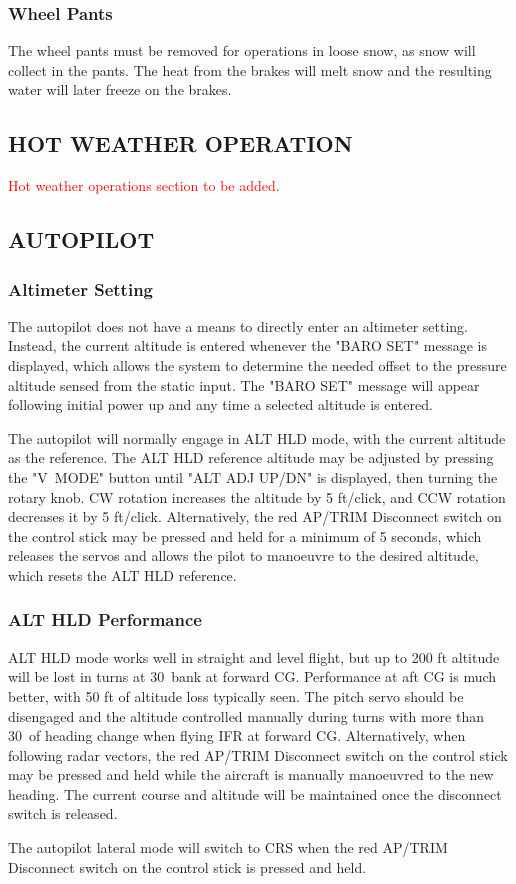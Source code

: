 \subsubsection{Wheel Pants} The wheel pants must be removed for operations in loose snow, as snow will collect in the pants.  The heat from the brakes will melt snow and the resulting water will later freeze on the brakes.

\subsection{HOT WEATHER OPERATION}
\textcolor{red}{Hot weather operations section to be added.}

\subsection{AUTOPILOT}
\subsubsection{Altimeter Setting} The autopilot does not have a means to directly enter an altimeter setting. Instead, the current altitude is entered whenever the "BARO SET" message is displayed, which allows the system to determine the needed offset to the pressure altitude sensed from the static input. The "BARO SET" message will appear following initial power up and any time a selected altitude is entered.

The autopilot will normally engage in ALT HLD mode, with the current altitude as the reference. The ALT HLD reference altitude may be adjusted by pressing the "V~MODE" button until "ALT ADJ UP/DN" is displayed, then turning the rotary knob. CW rotation increases the altitude by 5 ft/click, and CCW rotation decreases it by 5 ft/click. Alternatively, the red AP/TRIM Disconnect switch on the control stick may be pressed and held for a minimum of 5 seconds, which releases the servos and allows the pilot to manoeuvre to the desired altitude, which resets the ALT HLD reference.

\subsubsection{ALT HLD Performance} ALT HLD mode works well in straight and level flight, but up to 200 ft altitude will be lost in turns at 30\textdegree \ bank at forward CG. Performance at aft CG is much better, with 50 ft of altitude loss typically seen. The pitch servo should be disengaged and the altitude controlled manually during turns with more than 30\textdegree \ of heading change when flying IFR at forward CG. Alternatively, when following radar vectors, the red AP/TRIM Disconnect switch on the control stick may be pressed and held while the aircraft is manually manoeuvred to the new heading.  The current course and altitude will be maintained once the disconnect switch is released.

\begin{Note}
  The autopilot lateral mode will switch to CRS when the red AP/TRIM Disconnect switch on the control stick is pressed and held.
\end{Note}
\cleardoublepage
